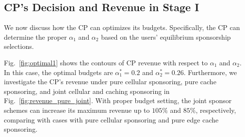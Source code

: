 \subsection{CP's Decision and Revenue in Stage I}

We now discuss how the CP can optimizes its budgets. Specifically, the CP can determine the proper $\alpha_1$ and $\alpha_2$ based on the users' equilibrium sponsorship selections.

Fig.~\ref{fig:optimal1} shows the contours of CP revenue with respect to $\alpha_1$ and $\alpha_2$. In this case, the optimal budgets are $\alpha_1^*=0.2$ and $\alpha_2^*=0.26$. Furthermore, we investigate the CP's revenue under pure cellular sponsoring, pure cache sponsoring, and joint cellular and caching sponsoring in Fig.~\ref{fig:revenue_pure_joint}. With proper budget setting, the joint sponsor schemes can increase its maximum revenue up to $105\%$ and $85\%$, respectively, comparing with cases with pure cellular sponsoring and pure edge cache sponsoring.
